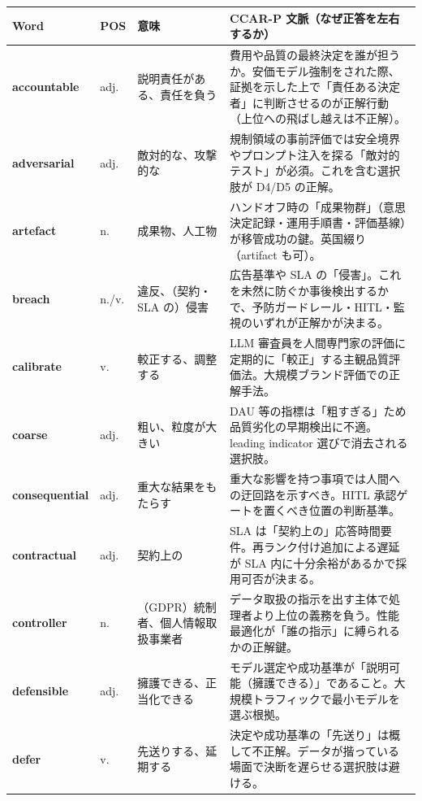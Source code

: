 \documentclass[10pt,a4paper]{article}
\newcommand{\W}[1]{\textbf{#1}}
\begin{document}
\begin{longtable}{@{}>{\raggedright\arraybackslash}p{23mm}
                    >{\raggedright\arraybackslash}p{13mm}
                    >{\raggedright\arraybackslash}p{38mm}
                    >{\raggedright\arraybackslash}p{114mm}@{}}
\rowcolor{chead!15}
\W{Word} & \W{POS} & \W{意味} & \W{CCAR-P 文脈（なぜ正答を左右するか）} \\
\endhead

\W{accountable} & adj. & 説明責任がある、責任を負う & 費用や品質の最終決定を誰が担うか。安価モデル強制をされた際、証拠を示した上で「責任ある決定者」に判断させるのが正解行動（上位への飛ばし越えは不正解）。 \\
\W{adversarial} & adj. & 敵対的な、攻撃的な & 規制領域の事前評価では安全境界やプロンプト注入を探る「敵対的テスト」が必須。これを含む選択肢が D4/D5 の正解。 \\
\W{artefact} & n. & 成果物、人工物 & ハンドオフ時の「成果物群」（意思決定記録・運用手順書・評価基線）が移管成功の鍵。英国綴り（artifact も可）。 \\
\W{breach} & n./v. & 違反、（契約・SLA の）侵害 & 広告基準や SLA の「侵害」。これを未然に防ぐか事後検出するかで、予防ガードレール・HITL・監視のいずれが正解かが決まる。 \\
\W{calibrate} & v. & 較正する、調整する & LLM 審査員を人間専門家の評価に定期的に「較正」する主観品質評価法。大規模ブランド評価での正解手法。 \\
\W{coarse} & adj. & 粗い、粒度が大きい & DAU 等の指標は「粗すぎる」ため品質劣化の早期検出に不適。leading indicator 選びで消去される選択肢。 \\
\W{consequential} & adj. & 重大な結果をもたらす & 重大な影響を持つ事項では人間への迂回路を示すべき。HITL 承認ゲートを置くべき位置の判断基準。 \\
\W{contractual} & adj. & 契約上の & SLA は「契約上の」応答時間要件。再ランク付け追加による遅延が SLA 内に十分余裕があるかで採用可否が決まる。 \\
\W{controller} & n. & （GDPR）統制者、個人情報取扱事業者 & データ取扱の指示を出す主体で処理者より上位の義務を負う。性能最適化が「誰の指示」に縛られるかの正解鍵。 \\
\W{defensible} & adj. & 擁護できる、正当化できる & モデル選定や成功基準が「説明可能（擁護できる）」であること。大規模トラフィックで最小モデルを選ぶ根拠。 \\
\W{defer} & v. & 先送りする、延期する & 決定や成功基準の「先送り」は概して不正解。データが揩っている場面で決断を遅らせる選択肢は避ける。 \\

\end{longtable}
\end{document}
